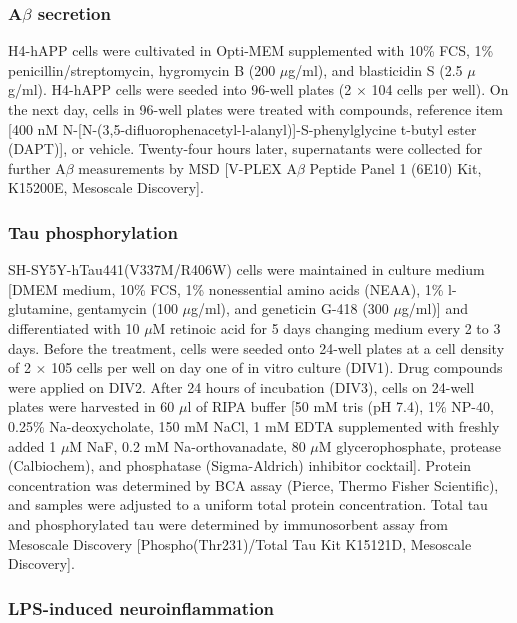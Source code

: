 \documentclass[letterpaper]{article}
\begin{document}
\subsubsection{A$\beta$ secretion}

H4-hAPP cells were cultivated in Opti-MEM supplemented with 10\% FCS, 1\%
penicillin/streptomycin, hygromycin B (200 $\mu$g/ml), and blasticidin S (2.5
$\mu$g/ml).  H4-hAPP cells were seeded into 96-well plates (2 $\times$ 104
cells per well). On the next day, cells in 96-well plates were treated with
compounds, reference item [400 nM
N-[N-(3,5-difluorophenacetyl-l-alanyl)]-S-phenylglycine t-butyl ester (DAPT)],
or vehicle. Twenty-four hours later, supernatants were collected for further
A$\beta$ measurements by MSD [V-PLEX A$\beta$ Peptide Panel 1 (6E10) Kit,
K15200E, Mesoscale Discovery].

\subsubsection{Tau phosphorylation}

SH-SY5Y-hTau441(V337M/R406W) cells were maintained in culture medium [DMEM
medium, 10\% FCS, 1\% nonessential amino acids (NEAA), 1\% l-glutamine,
gentamycin (100 $\mu$g/ml), and geneticin G-418 (300 $\mu$g/ml)] and
differentiated with 10 $\mu$M retinoic acid for 5 days changing medium every 2
to 3 days. Before the treatment, cells were seeded onto 24-well plates at a
cell density of 2 $\times$ 105 cells per well on day one of in vitro culture
(DIV1). Drug compounds were applied on DIV2. After 24 hours of incubation
(DIV3), cells on 24-well plates were harvested in 60 $\mu$l of RIPA buffer [50
mM tris (pH 7.4), 1\% NP-40, 0.25\% Na-deoxycholate, 150 mM NaCl, 1 mM EDTA
supplemented with freshly added 1 $\mu$M NaF, 0.2 mM Na-orthovanadate, 80
$\mu$M glycerophosphate, protease (Calbiochem), and phosphatase
(Sigma-Aldrich) inhibitor cocktail]. Protein concentration was determined by
BCA assay (Pierce, Thermo Fisher Scientific), and samples were adjusted to a
uniform total protein concentration. Total tau and phosphorylated tau were
determined by immunosorbent assay from Mesoscale Discovery
[Phospho(Thr231)/Total Tau Kit K15121D, Mesoscale Discovery].

\subsubsection{LPS-induced neuroinflammation}
\end{document}
